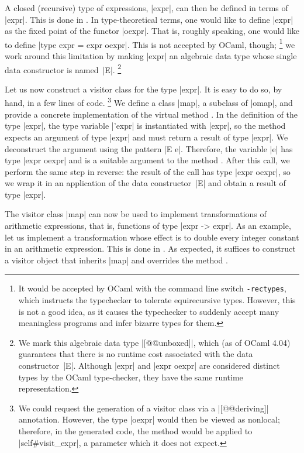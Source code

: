 \documentclass[11pt,a4paper,twoside]{article}
\begin{document}
A closed (recursive) type of expressions, \oc|expr|, can then be defined in
terms of \oc|expr|. This is done in . In type-theoretical
terms, one would like to define \oc|expr| as the fixed point of the functor
\oc|oexpr|.
That is, roughly speaking, one would like to define \oc|type expr = expr oexpr|.
This is not accepted by OCaml, though;%
%
\footnote{It would be accepted by OCaml with the command line switch
  \texttt{-rectypes}, which instructs the typechecker to tolerate
  equirecursive types. However, this is not a good idea, as it causes
  the typechecker to suddenly accept many meaningless programs and infer
  bizarre types for them.}
%
we work around this limitation by making \oc|expr| an algebraic data type
whose single data constructor is named~\oc|E|.%
%
\footnote{We mark this algebraic data type \oc|[@@unboxed]|, which (as of
  OCaml 4.04) guarantees that there is no runtime cost associated with the
  data constructor~\oc|E|. Although \oc|expr| and \oc|expr oexpr| are
  considered distinct types by the OCaml type-checker, they have the same
  runtime representation.}

Let us now construct a visitor class for the type \oc|expr|. It is easy to
do so, by hand, in a few lines of code.%
%
\footnote{We could request the generation of a visitor class via a
  \oc|[@@deriving]| annotation. However, the type \oc|oexpr| would then be
  viewed as nonlocal; therefore, in the generated code, the method
   would be applied to \oc|self#visit_expr|, a
  parameter which it does not expect.}
%
%
We define a class \oc|map|, a subclass of \oc|omap|, and provide a concrete
implementation of the virtual method . In the definition
of the type \oc|expr|, the type variable \oc|'expr| is instantiated with
\oc|expr|, so the method  expects an argument of type
\oc|expr| and must return a result of type \oc|expr|. We deconstruct the
argument using the pattern \oc|E e|. Therefore, the variable \oc|e| has type
\oc|expr oexpr| and is a suitable argument to the method .
After this call, we perform the same step in reverse: the result of the call
has type \oc|expr oexpr|, so we wrap it in an application of the data
constructor~\oc|E| and obtain a result of type \oc|expr|.

The visitor class \oc|map| can now be used to implement transformations of
arithmetic expressions, that is, functions of type \oc|expr -> expr|. As an
example, let us implement a transformation whose effect is to double every
integer constant in an arithmetic expression. This is done in
. As expected, it suffices to construct a visitor
object that inherits \oc|map| and overrides the method
.
\end{document}
